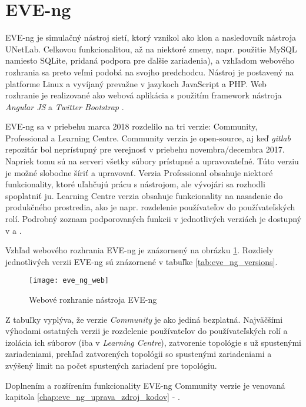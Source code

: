 \section{EVE-ng}
\label{chap:virt_lab_eve_ng}

EVE-ng je simulačný nástroj sietí, ktorý vznikol ako klon a nasledovník nástroja UNetLab. Celkovou funkcionalitou, až na niektoré zmeny, napr. použitie MySQL namiesto SQLite, pridaná podpora pre ďalšie zariadenia), a vzhľadom webového rozhrania sa preto veľmi podobá na svojho predchodcu. Nástroj je postavený na platforme Linux a vyvíjaný prevažne v jazykoch JavaScript a PHP. Web rozhranie je realizované ako webová aplikácia s použitím framework nástroja \emph{Angular JS} a \emph{Twitter Bootstrap} \cite{eve_ng_technologies}.

EVE-ng sa v priebehu marca 2018 rozdelilo na tri verzie: Community, Professional a Learning Centre. Community verzia je open-source, aj keď \emph{gitlab} repozitár bol neprístupný pre verejnosť v priebehu novembra/decembra 2017. Napriek tomu sú na serveri všetky súbory prístupné a upravovateľné. Túto verziu je možné slobodne šíriť a upravovať. Verzia Professional obsahuje niektoré funkcionality, ktoré uľahčujú prácu s nástrojom, ale vývojári sa rozhodli spoplatniť ju. Learning Centre verzia obsahuje funkcionality na nasadenie do produkčného prostredia, ako je napr. rozdelenie používateľov do používateľských rolí. Podrobný zoznam podporovaných funkcii v jednotlivých verziách je dostupný v \cite{eve_ng_versions_table} a \cite{eve_ng_versions_list}.

Vzhľad webového rozhrania EVE-ng je znázornený na obrázku \ref{obr:eve_ng_web}. Rozdiely jednotlivých verzii EVE-ng sú znázornené v tabuľke \ref{tab:eve_ng_versions}.

\begin{figure}
    \centering
    \texttt{[image: eve\_ng\_web]}
    \caption{Webové rozhranie nástroja EVE-ng}
    \label{obr:eve_ng_web}
\end{figure}

Z tabuľky vyplýva, že verzie \emph{Community} je ako jediná bezplatná. Najväčšími výhodami ostatných verzii je rozdelenie používateľov do používateľských rolí a izolácia ich súborov (iba v \emph{Learning Centre}), zatvorenie topológie s už spustenými zariadeniami, prehľad zatvorených topológii so spustenými zariadeniami a zvýšený limit na počet spustených zariadení pre topológiu.

Doplnením a rozšírením funkcionality EVE-ng Community verzie je venovaná kapitola \ref{chap:eve_ng_uprava_zdroj_kodov} - .

